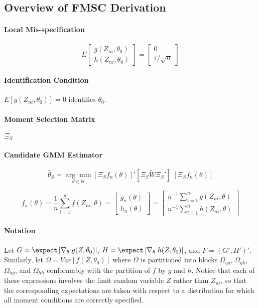 \documentclass[12pt]{article}
\theoremstyle{definition}
\begin{document}
\subsection{Overview of FMSC Derivation}

\paragraph{Local Mis-specification}
	$$E\left[\begin{array}
		{c}
		g(Z_{ni},\theta_0)\\
		h(Z_{ni}, \theta_0)
	\end{array} \right] = \left[ \begin{array}
		{c} 0 \\ \tau/\sqrt{n}
	\end{array}\right]$$

\paragraph{Identification Condition} $E[g(Z_{ni},\theta_0)]=0$ identifies $\theta_0$.

\paragraph{Moment Selection Matrix} $\Xi_S$

\paragraph{Candidate GMM Estimator}
	$$\widehat{\theta}_S = \underset{\theta \in \Theta}{\arg \min} \left[\Xi_S f_n(\theta)\right]' \left[ \Xi_S \widetilde{W} \Xi_S'\right] \; \left[ \Xi_S f_n(\theta)\right]$$

$$f_n(\theta) = \frac{1}{n}\sum_{i=1}^n f(Z_{ni},\theta) = \left[\begin{array}{c} g_n(\theta)\\ h_n(\theta) \end{array} \right]=\left[\begin{array}{c}n^{-1}\sum_{i=1}^n g(Z_{ni},\theta) \\ n^{-1}\sum_{i=1}^n h(Z_{ni},\theta) \end{array}\right]$$

\paragraph{Notation}
Let $G = \expect\left[\nabla_{\theta} \; g(Z,\theta_0)\right]$, $H = \expect\left[\nabla_{\theta} \; h(Z,\theta_0)\right]$, and $F = (G', H')'$. Similarly, let $\Omega = Var\left[ f(Z,\theta_0) \right]$ where $\Omega$ is partitioned into blocks $\Omega_{gg}$, $\Omega_{gh}$, $\Omega_{hg}$, and $\Omega_{hh}$ conformably with the partition of $f$ by $g$ and $h$. Notice that each of these expressions involves the limit random variable $Z$ rather than $Z_{ni}$, so that the corresponding expectations are taken with respect to a distribution for which all moment conditions are correctly specified.
\end{document}
